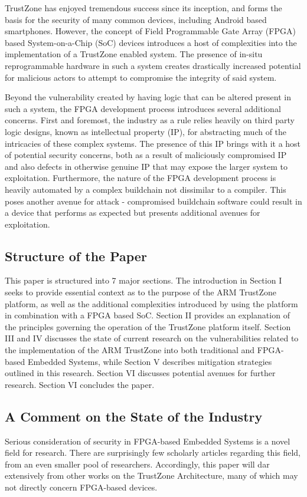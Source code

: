 \documentclass[journal]{IEEEtran}
\begin{document}
TrustZone has enjoyed tremendous success since its inception, and forms the basis for the
security of many common devices, including Android based smartphones. However, the concept
of Field Programmable Gate Array (FPGA) based System-on-a-Chip (SoC) devices introduces a
host of complexities into the implementation of a TrustZone enabled system. The
presence of in-situ reprogrammable hardware in such a system creates drastically increased
potential for malicious actors to attempt to compromise the integrity of said system.

Beyond the vulnerability created by having logic that can be altered present in such a
system, the FPGA development process introduces several additional concerns. First and
foremost, the industry as a rule relies heavily on third party logic designs, known as 
intellectual property (IP), for abstracting much of the intricacies of these complex 
systems. The presence of this IP brings with it a host of potential security concerns,
both as a result of maliciously compromised IP and also defects in otherwise genuine IP 
that may expose the larger system to exploitation. Furthermore, the nature of the FPGA
development process is heavily automated by a complex buildchain not dissimilar to a
compiler. This poses another avenue for attack - compromised buildchain software could
result in a device that performs as expected but presents additional avenues for
exploitation.

\subsection{Structure of the Paper}
This paper is structured into 7 major sections. The introduction in Section I seeks to
provide essential context as to the purpose of the ARM TrustZone platform, as well as the 
additional complexities introduced by using the platform in combination with a FPGA based 
SoC. Section II provides an explanation of the principles governing the operation of the 
TrustZone platform itself. Section III and IV discusses the state of current research on
the vulnerabilities related to the implementation of the ARM TrustZone into both 
traditional and FPGA-based Embedded Systems, while Section V describes mitigation
strategies outlined in this research. Section VI discusses potential avenues for further 
research. Section VI concludes the paper.

\subsection{A Comment on the State of the Industry}
Serious consideration of security in FPGA-based Embedded Systems is a novel field for
research. There are surprisingly few scholarly articles regarding this field, from an even
smaller pool of researchers. Accordingly, this paper will dar extensively from other works
on the TrustZone Architecture, many of which may not directly concern FPGA-based devices.
\end{document}
